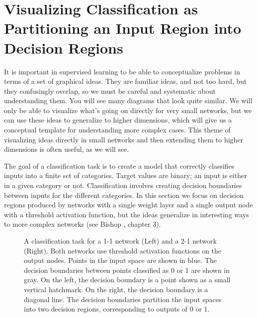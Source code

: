 \section{Visualizing Classification as Partitioning an Input Region into Decision Regions}
\label{visClassification}



It is important in supervised learning to be able to conceptualize problems in terms of a set of graphical ideas. They are familiar ideas, and not too hard, but they confusingly overlap, so we must be careful and systematic about understanding them. You will see many diagrams that look quite similar. We will only be able to visualize what's going on directly for very small networks, but we can use these ideas to generalize to higher dimensions, which will give us a conceptual template for understanding more complex cases. This theme of visualizing ideas directly in small networks and then extending them to higher dimensions is often useful, as we will see.

The goal of a classification task is to create a model that correctly classifies inputs into a finite set of categories. Target values are binary; an input is either in a given category or not. Classification involves creating decision boundaries between inputs for the different categories. In this section we focus on decision regions produced by networks with a single weight layer and a single output node with a threshold activation function, but the ideas generalize in interesting ways to more complex networks (see Bishop \cite{bishop1995neural}, chapter 3).

\begin{figure}[h]
\centering
{}
\caption[Jeff Yoshimi.]{A classification task for a 1-1 network (Left) and a 2-1 network (Right). Both networks use threshold activation functions on the output nodes. Points in the input space are shown in  blue. The decision boundaries between points classified as 0 or 1 are shown in gray. On the left, the decision boundary is a point shown as a small vertical hatchmark. On the right, the decision boundary is a diagonal line. The decision boundaries partition the input spaces into two decision regions, corresponding to outputs of 0 or 1.}
\label{visualize_classification}
\end{figure}

